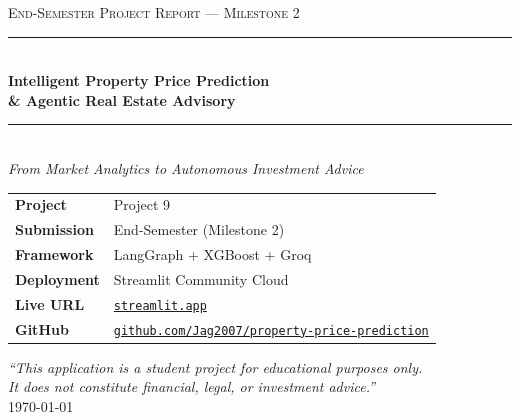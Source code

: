 \documentclass[12pt,a4paper]{article}
\begin{document}
\begin{titlepage}
  \centering
  \vspace*{1.5cm}

  {\fontsize{11}{13}\selectfont\color{mygray}\textsc{End-Semester Project Report --- Milestone 2}}\\[0.6cm]

  \rule{\linewidth}{1.5pt}\\[0.3cm]
  {\fontsize{22}{26}\bfseries\color{primary}
    Intelligent Property Price Prediction\\[0.25cm]
    \& Agentic Real Estate Advisory}\\[0.3cm]
  \rule{\linewidth}{1.5pt}\\[0.5cm]

  {\large\color{mygray}\textit{From Market Analytics to Autonomous Investment Advice}}\\[2cm]

  \begin{tabular}{ll}
    \textbf{Project}        & Project 9 \\[4pt]
    \textbf{Submission}     & End-Semester (Milestone 2) \\[4pt]
    \textbf{Framework}      & LangGraph + XGBoost + Groq \\[4pt]
    \textbf{Deployment}     & Streamlit Community Cloud \\[4pt]
    \textbf{Live URL}       & \href{https://property-price-prediction-real-estate.streamlit.app/}{\texttt{streamlit.app}} \\[4pt]
    \textbf{GitHub}         & \href{https://github.com/Jag2007/property-price-prediction}{\texttt{github.com/Jag2007/property-price-prediction}} \\
  \end{tabular}

  \vfill

  {\small\color{mygray}
    \textit{``This application is a student project for educational purposes only.}\\
    \textit{It does not constitute financial, legal, or investment advice.''}
  }\\[0.8cm]

  {\small\color{mygray}\today}
\end{titlepage}

\tableofcontents
\clearpage
\end{document}
